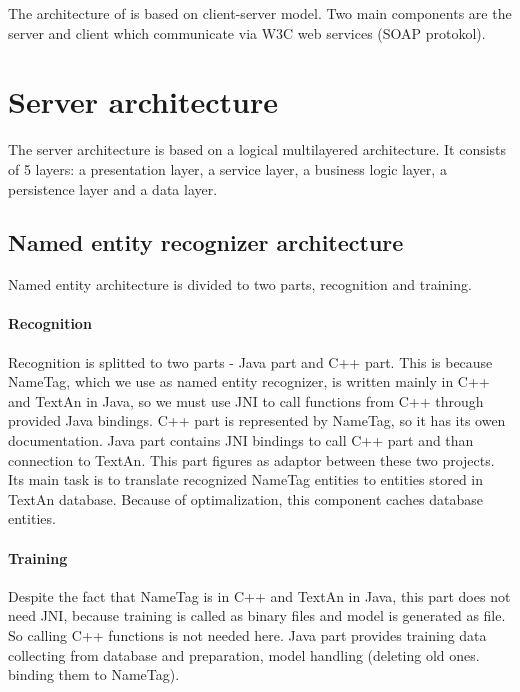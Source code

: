

The architecture of \textan{} is based on client-server model. Two main components
are the \textan{} server and \textan{} client which communicate via W3C web services
(SOAP protokol).

\section{Server architecture}

The server architecture is based on a logical multilayered architecture. It
consists of 5 layers: a presentation layer, a service layer, a business logic layer, 
a persistence layer and a data layer.




\subsection{Named entity recognizer architecture}

Named entity architecture is divided to two parts, recognition and training.
\paragraph{Recognition} 
Recognition is splitted to two parts - Java part and C++ part. This is because
NameTag, which we use as named entity recognizer, is written mainly in C++ and
TextAn in Java, so we must use JNI to call functions from C++ through provided
Java bindings. C++ part is represented by NameTag, so it has its owen documentation.
Java part contains JNI bindings to call C++ part and than connection to TextAn.
This part figures as adaptor between these two projects. Its main task is
to translate recognized NameTag entities to entities stored in TextAn database.
Because of optimalization, this component caches database entities.

\paragraph{Training}
Despite the fact that NameTag is in C++ and TextAn in Java, this part does 
not need JNI, because training is called as binary files and model is generated
as file. So calling C++ functions is not needed here. Java part provides
training data collecting from database and preparation, model handling
(deleting old ones. binding them to NameTag).


